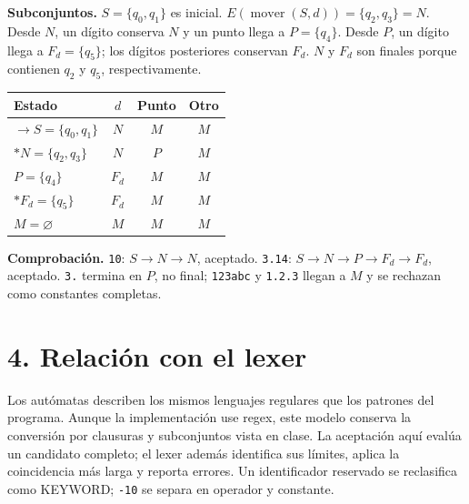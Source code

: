 \documentclass[10pt,letterpaper]{article}
\newcommand{\tok}[1]{\texttt{#1}}
\begin{document}
\textbf{Subconjuntos.} $S=\{q_0,q_1\}$ es inicial. $E(\operatorname{mover}(S,d))=\{q_2,q_3\}=N$. Desde $N$, un dígito conserva $N$ y un punto llega a $P=\{q_4\}$. Desde $P$, un dígito llega a $F_d=\{q_5\}$; los dígitos posteriores conservan $F_d$. $N$ y $F_d$ son finales porque contienen $q_2$ y $q_5$, respectivamente.
\begin{center}\begin{tabular}{lccc}\toprule Estado & $d$ & Punto & Otro\\\midrule
$\to S=\{q_0,q_1\}$ & $N$ & $M$ & $M$\\
$*N=\{q_2,q_3\}$ & $N$ & $P$ & $M$\\
$P=\{q_4\}$ & $F_d$ & $M$ & $M$\\
$*F_d=\{q_5\}$ & $F_d$ & $M$ & $M$\\
$M=\varnothing$ & $M$ & $M$ & $M$\\\bottomrule\end{tabular}\end{center}
\begin{center}\end{center}
\textbf{Comprobación.} \tok{10}: $S\to N\to N$, aceptado. \tok{3.14}: $S\to N\to P\to F_d\to F_d$, aceptado. \tok{3.} termina en $P$, no final; \tok{123abc} y \tok{1.2.3} llegan a $M$ y se rechazan como constantes completas.

\section*{4. Relación con el lexer}
Los autómatas describen los mismos lenguajes regulares que los patrones del programa. Aunque la implementación use regex, este modelo conserva la conversión por clausuras y subconjuntos vista en clase. La aceptación aquí evalúa un candidato completo; el lexer además identifica sus límites, aplica la coincidencia más larga y reporta errores. Un identificador reservado se reclasifica como KEYWORD; \tok{-10} se separa en operador y constante.
\end{document}
